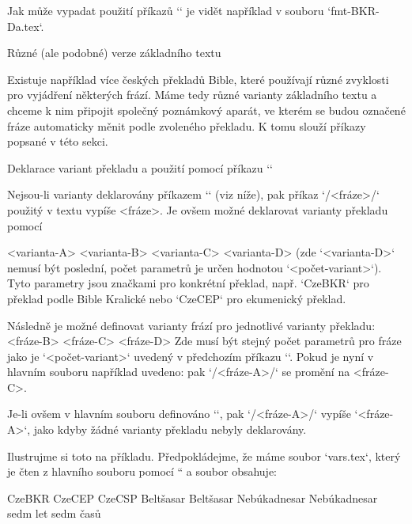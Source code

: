 Jak může vypadat použití příkazů `\fmt*` je vidět například v souboru
`fmt-BKR-Da.tex`.


 Různé (ale podobné) verze základního textu

Existuje například více českých překladů Bible, které používají různé zvyklosti pro
vyjádření některých frází. Máme tedy různé varianty základního textu a
chceme k nim připojit společný poznámkový aparát, ve kterém se budou
označené fráze automaticky měnit podle zvoleného překladu. K tomu slouží příkazy
popsané v této sekci.

\secc Deklarace variant překladu a použití pomocí příkazu `\x`

\mnote{\code{\\vdef} \code{\\x}}
Nejsou-li varianty deklarovány příkazem `\vdef` (viz níže), pak
příkaz `\x/<fráze>/` použitý v textu vypíše <fráze>. Je ovšem možné
deklarovat varianty překladu
\mnote{\code{\\variants}}%
pomocí

\begtt
{} {<varianta-A>} {<varianta-B>} {<varianta-C>} {<varianta-D>}
\endtt
(zde `<varianta-D>` nemusí být poslední, počet parametrů je určen hodnotou
`<počet-variant>`). Tyto parametry jsou značkami pro konkrétní překlad, např.
`CzeBKR` pro překlad podle Bible Kralické nebo `CzeCEP` pro ekumenický překlad.

Následně je možné definovat varianty frází pro jednotlivé varianty překladu:
\begtt
{} {<fráze-B>} {<fráze-C>} {<fráze-D>}
\endtt
Zde musí být stejný počet parametrů pro fráze jako je `<počet-variant>` uvedený v
předchozím příkazu `\variants`.
Pokud je nyní v hlavním souboru například
\mnote{\code{\\tmark}}
uvedeno:
\begtt
\def\tmark {<varianta-C>}
\endtt
pak `\x/<fráze-A>/` se promění na <fráze-C>.

Je-li ovšem v hlavním souboru
definováno `\def\tmark {<varianta-A>}`, pak `\x/<fráze-A>/` vypíše
`<fráze-A>`, jako kdyby žádné varianty překladu nebyly deklarovány.

Ilustrujme si toto na příkladu. Předpokládejme, že máme soubor `vars.tex`,
který je čten z hlavního souboru pomocí `` a soubor obsahuje:

\begtt
{} {CzeBKR}         {CzeCEP}       {CzeCSP}
       {Beltšasar}    {Beltšasar}
 {Nebúkadnesar} {Nebúkadnesar}
       {sedm let}     {sedm časů}
\endtt

